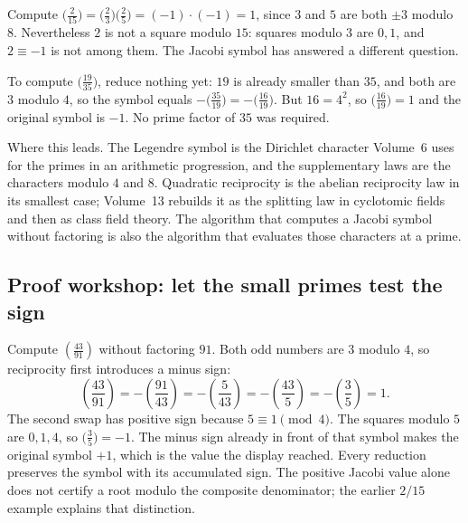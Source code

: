 \begin{examplex}
Compute $\bigl(\frac{2}{15}\bigr)=\bigl(\frac{2}{3}\bigr)\bigl(\frac{2}{5}\bigr)=(-1)\cdot(-1)=1$, since $3$ and $5$ are both $\pm 3$ modulo $8$.
Nevertheless $2$ is not a square modulo $15$: squares modulo $3$ are $0,1$, and $2\equiv -1$ is not among them. The Jacobi symbol has answered a different question.
\end{examplex}

\begin{examplex}
To compute $\bigl(\frac{19}{35}\bigr)$, reduce nothing yet: $19$ is already smaller than $35$, and both are $3$ modulo $4$, so the symbol equals $-\bigl(\frac{35}{19}\bigr)=-\bigl(\frac{16}{19}\bigr)$.
But $16=4^2$, so $\bigl(\frac{16}{19}\bigr)=1$ and the original symbol is $-1$.
No prime factor of $35$ was required.
\end{examplex}

\begin{beauty}
Where this leads. The Legendre symbol is the Dirichlet character Volume~6 uses for the primes in an arithmetic progression, and the supplementary laws are the characters modulo $4$ and $8$. Quadratic reciprocity is the abelian reciprocity law in its smallest case; Volume~13 rebuilds it as the splitting law in cyclotomic fields and then as class field theory. The algorithm that computes a Jacobi symbol without factoring is also the algorithm that evaluates those characters at a prime.
\end{beauty}

\subsection*{Proof workshop: let the small primes test the sign}

Compute $\left(\frac{43}{91}\right)$ without factoring $91$.
Both odd numbers are $3$ modulo $4$, so reciprocity first introduces a minus sign:
\[
\left(\frac{43}{91}\right)
=-\left(\frac{91}{43}\right)
=-\left(\frac5{43}\right)
=-\left(\frac{43}{5}\right)
=-\left(\frac35\right)=1.
\]
The second swap has positive sign because $5\equiv1\pmod4$.
The squares modulo $5$ are $0,1,4$, so $\bigl(\frac35\bigr)=-1$. The minus sign already in front of that symbol makes the original symbol $+1$, which is the value the display reached.
Every reduction preserves the symbol with its accumulated sign.
The positive Jacobi value alone does not certify a root modulo the
composite denominator; the earlier $2/15$ example explains that distinction.


